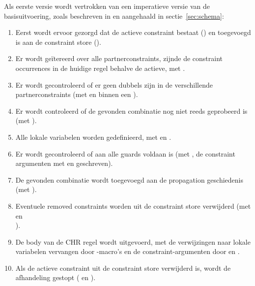 {Als eerste versie wordt vertrokken van een imperatieve versie van de basisuitvoering, zoals beschreven in \cite{tomsphdthesis} en aangehaald in sectie~\ref{sec:schema}:
\begin{enumerate}
  \item Eerst wordt ervoor gezorgd dat de actieve constraint bestaat () en toegevoegd is aan de constraint store ().
  \item Er wordt ge\"itereerd over alle partnerconstraints, zijnde de constraint occurrences in de huidige regel behalve de actieve, met .
  \item Er wordt gecontroleerd of er geen dubbels zijn in de verschillende partnerconstraints (met  en  binnen een ).
  \item Er wordt controleerd of de gevonden combinatie nog niet reeds geprobeerd is (met ).
  \item Alle lokale variabelen worden gedefinieerd, met  en .
  \item Er wordt gecontroleerd of aan alle guards voldaan is (met , de constraint argumenten met  en  geschreven).
  \item De gevonden combinatie wordt toegevoegd aan de propagation geschiedenis (met ).
  \item Eventuele removed constraints worden uit de constraint store verwijderd (met  en \\ ).
  \item De body van de CHR regel wordt uitgevoerd, met de verwijzingen naar lokale variabelen vervangen door -macro's en de constraint-argumenten door  en .
  \item Als de actieve constraint uit de constraint store verwijderd is, wordt de afhandeling gestopt ( en ).
\end{enumerate}

}
